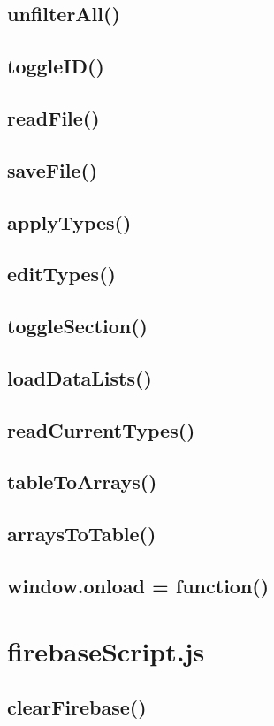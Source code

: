 \documentclass[letterpaper]{article}
\begin{document}
\subsection{unfilterAll()}
\subsection{toggleID()}
\subsection{readFile()}
\subsection{saveFile()}
\subsection{applyTypes()}
\subsection{editTypes()}
\subsection{toggleSection()}
\subsection{loadDataLists()}
\subsection{readCurrentTypes()}
\subsection{tableToArrays()}
\subsection{arraysToTable()}
\subsection{window.onload = function()}

\newpage

\section{firebaseScript.js}

\subsection{clearFirebase()}
\end{document}

